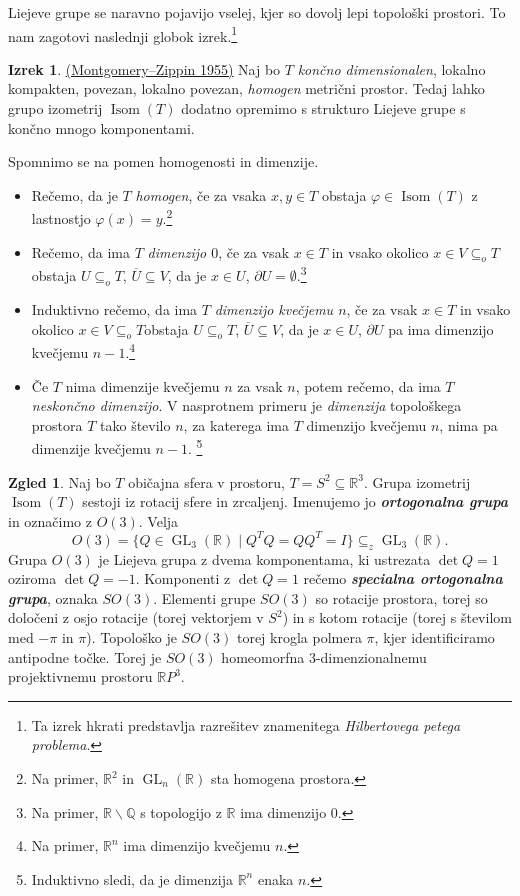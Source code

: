 \documentclass[11pt]{book}
\def\QQ{\mathbb{Q}}
\def\RR{\mathbb{R}}
\DeclareMathOperator\GL{GL}
\DeclareMathOperator\Isom{Isom}
\def\definicija{\color{rdeca}\bf\em}
\theoremstyle{definition}
\theoremstyle{zgled}
\newtheorem*{zgled}{Zgled}
\theoremstyle{odprtproblem}
\theoremstyle{domacanaloga}
\theoremstyle{izrek}
\newtheorem*{izrek}{Izrek}
\begin{document}
Liejeve grupe se naravno pojavijo vselej, kjer so dovolj lepi topološki prostori. To nam zagotovi naslednji globok izrek.\footnote{Ta izrek hkrati predstavlja razrešitev znamenitega {\em Hilbertovega petega problema}.}

\begin{izrek}\href{http://www.personal.psu.edu/bvk102/Papers/MZ.pdf}{(Montgomery--Zippin 1955)}
Naj bo $T$ {\em končno dimensionalen}, lokalno kompakten, povezan, lokalno povezan, {\em homogen} metrični prostor. Tedaj lahko grupo izometrij $\Isom(T)$ dodatno opremimo s strukturo Liejeve grupe s končno mnogo komponentami.
\end{izrek}

Spomnimo se na pomen homogenosti in dimenzije.
\begin{itemize}
    \item Rečemo, da je $T$ {\em homogen}, če za vsaka $x,y \in T$ obstaja $\varphi \in \Isom(T)$ z lastnostjo $\varphi(x) = y$.\footnote{Na primer, $\RR^2$ in $\GL_n(\RR)$ sta homogena prostora.} 

    \item Rečemo, da ima $T$ {\em dimenzijo $0$}, če za vsak $x \in T$ in vsako okolico $x \in V \subseteq_o T$ obstaja $U \subseteq_o T$, $\overline{U} \subseteq V$, da je $x \in U$, $\partial U = \emptyset$.\footnote{Na primer, $\RR \backslash \QQ$ s topologijo z $\RR$ ima dimenzijo $0$.} 

    \item Induktivno rečemo, da ima $T$ {\em dimenzijo kvečjemu $n$}, če za vsak $x \in T$ in vsako okolico $x \in V \subseteq_o T$obstaja $U \subseteq_o T$, $\overline{U} \subseteq V$, da je $x \in U$, $\partial U$ pa ima dimenzijo kvečjemu $n-1$.\footnote{Na primer, $\RR^n$ ima dimenzijo kvečjemu $n$.}

    \item Če $T$ nima dimenzije kvečjemu $n$ za vsak $n$, potem rečemo, da ima $T$ {\em neskončno dimenzijo}. V nasprotnem primeru je {\em dimenzija} topološkega prostora $T$ tako število $n$, za katerega ima $T$ dimenzijo kvečjemu $n$, nima pa dimenzije kvečjemu $n-1$.  \footnote{Induktivno sledi, da je dimenzija $\RR^n$ enaka $n$.}
\end{itemize}

\begin{zgled}
Naj bo $T$ običajna sfera v prostoru, $T = S^2 \subseteq \RR^3$. Grupa izometrij $\Isom(T)$ sestoji iz rotacij sfere in zrcaljenj. Imenujemo jo {\definicija ortogonalna grupa} in označimo z $O(3)$. Velja
\[
O(3) = \{ Q \in \GL_3(\RR) \mid Q^T Q = Q Q^T = I \} \subseteq_z \GL_3(\RR).
\]
Grupa $O(3)$ je Liejeva grupa z dvema komponentama, ki ustrezata $\det Q = 1$ oziroma $\det Q = -1$. Komponenti z $\det Q = 1$ rečemo {\definicija specialna ortogonalna grupa}, oznaka $SO(3)$. Elementi grupe $SO(3)$ so rotacije prostora, torej so določeni z osjo rotacije (torej vektorjem v $S^2$) in s kotom rotacije (torej s številom med $- \pi$ in $\pi$). Topološko je $SO(3)$ torej krogla polmera $\pi$, kjer identificiramo antipodne točke. Torej je $SO(3)$ homeomorfna $3$-dimenzionalnemu projektivnemu prostoru $\RR P^3$.
\end{zgled}
\end{document}
